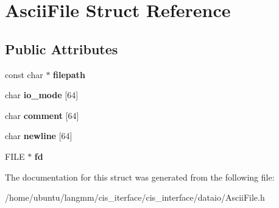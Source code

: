 \hypertarget{structAsciiFile}{}\section{Ascii\+File Struct Reference}
\label{structAsciiFile}
\subsection*{Public Attributes}
\begin{DoxyCompactItemize}
\item 
\mbox{\label{structAsciiFile_a943bff7edf4fa3310cfc80093f719058}} 
const char $\ast$ {\bfseries filepath}
\item 
\mbox{\label{structAsciiFile_a28af310876444d92cafbe961dfd7f447}} 
char {\bfseries io\+\_\+mode} \mbox{[}64\mbox{]}
\item 
\mbox{\label{structAsciiFile_ac6ec6edf3c80ec10b3076aaaad2d2543}} 
char {\bfseries comment} \mbox{[}64\mbox{]}
\item 
\mbox{\label{structAsciiFile_ae4e7b9b8b86b0bee4835f2eb183f048c}} 
char {\bfseries newline} \mbox{[}64\mbox{]}
\item 
\mbox{\label{structAsciiFile_a971e8089527d5d8be168a047ae66c116}} 
F\+I\+LE $\ast$ {\bfseries fd}
\end{DoxyCompactItemize}


The documentation for this struct was generated from the following file\+:\begin{DoxyCompactItemize}
\item 
/home/ubuntu/langmm/cis\+\_\+iterface/cis\+\_\+interface/dataio/Ascii\+File.\+h\end{DoxyCompactItemize}
